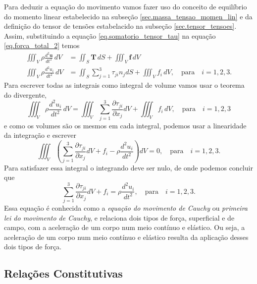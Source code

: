 Para deduzir a equa\c{c}\~ao do movimento vamos fazer uso do conceito de equil\'ibrio do momento linear estabelecido na subse\c{c}\~ao \ref{sec.massa_tensao_momen_lin} e da defini\c{c}\~ao do tensor de tens\~oes estabelacido na subse\c{c}\~ao \ref{sec.tensor_tensoes}. Assim, substituindo a equa\c{c}\~ao \ref{eq.somatorio_tensor_tau} na equa\c{c}\~ao \ref{eq.forca_total_2} temos
\begin{align*}
\iiint_V\rho\frac{d^2\mathbf{u}}{dt^2}\,dV&=\iint_S\mathbf{T}\,dS+\iiint_V\mathbf{f}\,dV\\
\iiint_V\rho\frac{d^2u_i}{dt^2}\,dV&=\iint_S\sum_{j=1}^3\tau_{ji}n_jdS+\iiint_Vf_i\,dV,\quad \text{para}\quad i=1,2,3.
\end{align*}
Para escrever todas as integrais como integral de volume vamos usar o teorema do divergente,
\begin{equation}
\iiint_V\rho\frac{d^2u_i}{dt^2}\,dV=\iiint_V\sum_{j=1}^3\frac{\partial\tau_{ji}}{\partial x_j}dV+\iiint_Vf_i\,dV,\quad \text{para}\quad i=1,2,3
\end{equation}
e como os volumes s\~ao os mesmos em cada integral, podemos usar a linearidade da integra\c{c}\~ao e escrever
\begin{equation}
\iiint_V\left(\sum_{j=1}^3\frac{\partial\tau_{ji}}{\partial x_j}dV+f_i-\rho\frac{d^2u_i}{dt^2}\right)dV=0,\quad \text{para}\quad i=1,2,3.
\end{equation}
Para satisfazer essa integral o integrando deve ser nulo, de onde podemos concluir que
\begin{equation}
\sum_{j=1}^3\frac{\partial\tau_{ji}}{\partial x_j}dV+f_i=\rho\frac{d^2u_i}{dt^2},\quad \text{para}\quad i=1,2,3.
\end{equation}
Essa equa\c{c}\~ao \'e conhecida como a \textit{equa\c{c}\~ao do movimento de Cauchy} ou \textit{primeira lei do movimento de Cauchy}, e relaciona dois tipos de for\c{c}a, superficial e de campo, com a acelera\c{c}\~ao de um corpo num meio cont\'inuo e el\'astico. Ou seja, a acelera\c{c}\~ao de um corpo num meio cont\'inuo e el\'astico resulta da aplica\c{c}\~ao desses dois tipos de for\c{c}a.

\subsection{Rela\c{c}\~oes Constitutivas}

